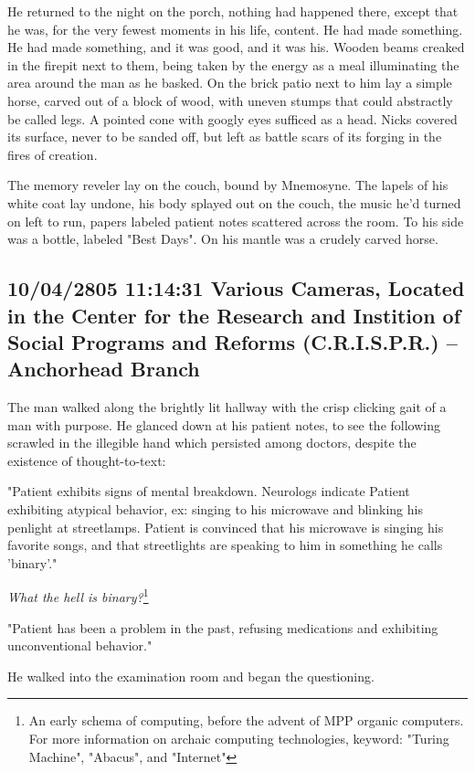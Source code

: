 \documentclass[12pt]{article}
\begin{document}
He returned to the night on the porch, nothing had happened there, except that he was, for the very fewest moments in his life, content. He had made something. He had made something, and it was good, and it was his. Wooden beams creaked in the firepit next to them, being taken by the energy as a meal illuminating the area around the man as he basked. On the brick patio next to him lay a simple horse, carved out of a block of wood, with uneven stumps that could abstractly be called legs. A pointed cone with googly eyes sufficed as a head. Nicks covered its surface, never to be sanded off, but left as battle scars of its forging in the fires of creation.

The memory reveler lay on the couch, bound by Mnemosyne. The lapels of his white coat lay undone, his body splayed out on the couch, the music he'd turned on left to run, papers labeled patient notes scattered across the room. To his side was a bottle, labeled "Best Days". On his mantle was a crudely carved horse.

\subsection*{10/04/2805 11:14:31 Various Cameras, Located in the Center for the Research and Instition of Social Programs and Reforms (C.R.I.S.P.R.) -- Anchorhead Branch}
\label{sec:org8e6006d}

The man walked along the brightly lit hallway with the crisp clicking gait of a man with purpose. He glanced down at his patient notes, to see the following scrawled in the illegible hand which persisted among doctors, despite the existence of thought-to-text:

"Patient exhibits signs of mental breakdown. Neurologs indicate Patient exhibiting atypical behavior, ex: singing to his microwave and blinking his penlight at streetlamps. Patient is convinced that his microwave is singing his favorite songs, and that streetlights are speaking to him in something he calls 'binary'."

\emph{What the hell is binary?}\footnote{An early schema of computing, before the advent of MPP organic computers. For more information on archaic computing technologies, keyword: "Turing Machine", "Abacus", and "Internet"}

"Patient has been a problem in the past, refusing medications and exhibiting unconventional behavior."

He walked into the examination room and began the questioning.
\end{document}
